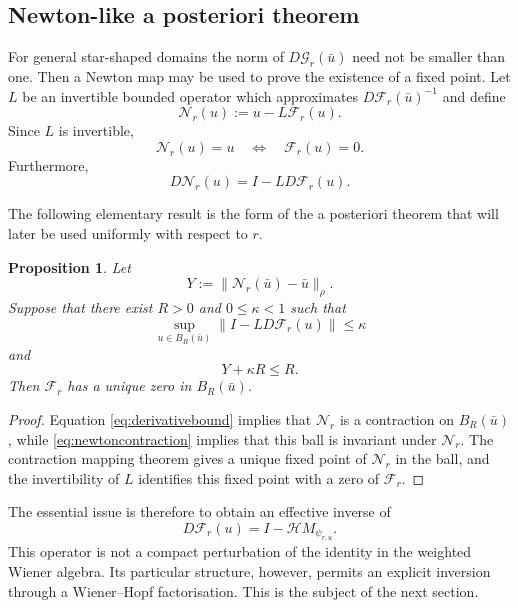 \documentclass[11pt,a4paper]{amsart}
\newtheorem{proposition}[theorem]{Proposition}
\begin{document}
\subsection{Newton-like a posteriori theorem}

For general star-shaped domains the norm of
$D\mathcal G_r(\bar u)$ need not be smaller than one. Then a Newton map may be used to prove the existence of a fixed point. Let $L$ be an
invertible bounded operator which approximates
$D\mathcal F_r(\bar u)^{-1}$ and define
\begin{equation}\label{eq:NewtonMap}
	\mathcal N_r(u):=u-L\mathcal F_r(u).
\end{equation}
Since $L$ is invertible,
\[
\mathcal N_r(u)=u
\quad\Longleftrightarrow\quad
\mathcal F_r(u)=0.
\]
Furthermore,
\begin{equation}\label{eq:DN}
	D\mathcal N_r(u)
	=
	I-LD\mathcal F_r(u).
\end{equation}

The following elementary result is the form of the a posteriori
theorem that will later be used uniformly with respect to $r$.

\begin{proposition}\label{prop:newtonvalidation}
	Let
	\[
	Y:=\|\mathcal N_r(\bar u)-\bar u\|_\rho.
	\]
	Suppose that there exist $R>0$ and $0\le\kappa<1$ such that
	\begin{equation}\label{eq:derivativebound}
		\sup_{u\in B_R(\bar u)}
		\|I-LD\mathcal F_r(u)\|
		\le\kappa
	\end{equation}
	and
	\begin{equation}\label{eq:newtoncontraction}
		Y+\kappa R\le R.
	\end{equation}
	Then $\mathcal F_r$ has a unique zero in $B_R(\bar u)$.
\end{proposition}

\begin{proof}
	Equation \eqref{eq:derivativebound} implies that $\mathcal N_r$ is a
	contraction on $B_R(\bar u)$, while
	\eqref{eq:newtoncontraction} implies that this ball is invariant under
	$\mathcal N_r$. The contraction mapping theorem gives a unique fixed
	point of $\mathcal N_r$ in the ball, and the invertibility of $L$
	identifies this fixed point with a zero of $\mathcal F_r$.
\end{proof}

The essential issue is therefore to obtain an effective inverse of
\[
D\mathcal F_r(u)
=
I-\mathcal H M_{\psi_{r,u}}.
\]
This operator is not a compact perturbation of the identity in the
weighted Wiener algebra. Its particular structure, however, permits
an explicit inversion through a Wiener--Hopf factorisation. This is
the subject of the next section.
\end{document}
